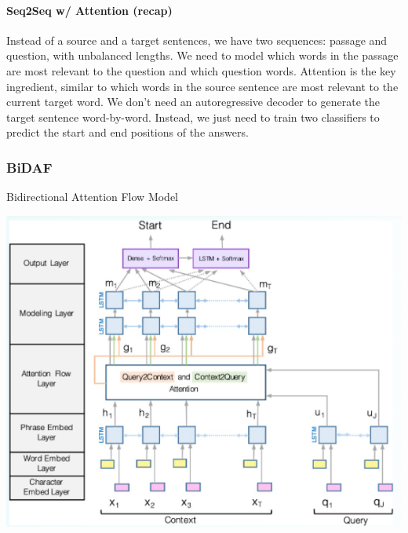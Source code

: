 \documentclass[10pt]{report}
\begin{document}
\paragraph{Seq2Seq w/ Attention (recap)} Instead of a source and a target sentences, we have two sequences: passage and question, with unbalanced lengths. We need to model which words in the passage are most relevant to the question and which question words. Attention is the key ingredient, similar to which words in the source sentence are most relevant to the current target word. We don't need an autoregressive decoder to generate the target sentence word-by-word. Instead, we just need to train two classifiers to predict the start and end positions of the answers.
\subsubsection{BiDAF} Bidirectional Attention Flow Model
\begin{center}
	\includegraphics[scale=0.5]{124.png}
\end{center}
\end{document}
